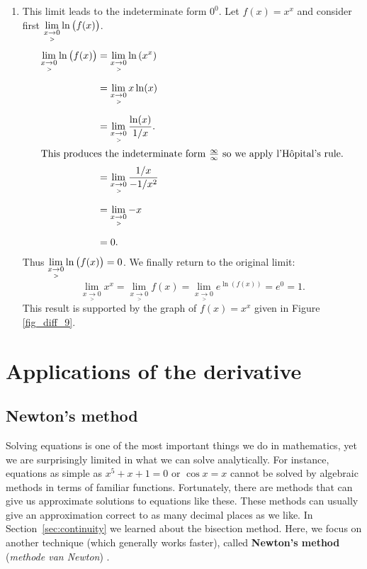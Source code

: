 \begin{example}
\begin{enumerate}
\item		This limit leads to the indeterminate form $0^0$. Let $f(x) = x^x$ and consider first $\displaystyle\lim_{x\underset{>}{\rightarrow}0} \ln\big(f(x)\big)$. 
\allowdisplaybreaks
\begin{align*}
\lim_{x\underset{>}{\rightarrow}0} \ln\big(f(x)\big) &= \lim_{x\underset{>}{\rightarrow}0} \ln\left(x^x\right) \\[0.2cm]
			&= \lim_{x\underset{>}{\rightarrow}0} x\ln (x) \\[0.2cm]
			&= \lim_{x\underset{>}{\rightarrow}0} \frac{\ln (x)}{1/x}.\\
			\intertext{This produces the indeterminate form $\frac{\infty}{\infty}$ so we apply l'H\^opital's rule.}
			&=	\lim_{x\underset{>}{\rightarrow}0} \frac{1/x}{-1/x^2} \\[0.2cm]
			&= \lim_{x\underset{>}{\rightarrow}0} -x \\[0.2cm]
			&= 0.
\end{align*}
Thus $\displaystyle\lim_{x\underset{>}{\rightarrow}0} \ln\big(f(x)\big) =0$. We finally return to the original limit:
$$\lim_{x\underset{>}{\rightarrow}0} x^x = \lim_{x\underset{>}{\rightarrow}0} f(x) = \lim_{x\underset{>}{\rightarrow}0} e^{\ln(f(x))} = e^0 = 1.$$
This result is supported by the graph of $f(x)=x^x$ given in Figure \ref{fig_diff_9}.
\end{enumerate}
\end{example}

\fi

\ifcourse
\section{Applications of the derivative}\label{sec:applications}
\subsection{Newton's method}\label{sec:newton} 
Solving equations is one of the most important things we do in mathematics, yet we are surprisingly limited in what we can solve analytically.  For instance, equations as simple as $x^5+x+1=0$ or $\cos x =x $ cannot be solved by algebraic methods in terms of familiar functions.  Fortunately, there are methods that can give us approximate solutions to equations like these.  These methods can usually give an approximation correct to as many decimal places as we like. In Section~\ref{sec:continuity} we learned about the bisection method.  Here, we focus on another technique (which generally works faster), called \textbf{Newton's method} (\textit{methode van Newton}) .

